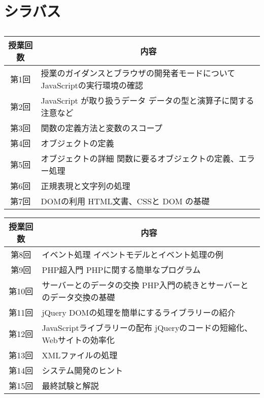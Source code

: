 \section{シラバス}\subsection{}
\begin{frame}
 \begin{center}
\begin{tabular}{|c|m{}|}\hline
 授業回数&\multicolumn{1}{c|}{内容}\\\hline
 第1回&授業のガイダンスとブラウザの開発者モードについて \newline
     JavaScriptの実行環境の確認\\\hline
 第2回&JavaScript が取り扱うデータ\newline
     データの型と演算子に関する注意など\\\hline
 第3回& 関数の定義方法と変数のスコープ\\\hline
 第4回& オブジェクトの定義\\\hline
 第5回&オブジェクトの詳細\newline
     関数に要るオブジェクトの定義、エラー処理\\\hline
 第6回&正規表現と文字列の処理  \\\hline
 第7回&DOMの利用\newline
     HTML文書、CSSと DOM の基礎\\\hline
\end{tabular}
\end{center}
\end{frame}
\begin{frame}
 \begin{center}
\begin{tabular}{|c|m{}|}\hline
 授業回数&\multicolumn{1}{c|}{内容}\\\hline
 第8回&イベント処理 \newline
     イベントモデルとイベント処理の例\\\hline
 第9回&PHP超入門\newline
       PHPに関する簡単なプログラム\\\hline
 第10回&サーバーとのデータの交換\newline
     PHP入門の続きとサーバーとのデータ交換の基礎\\\hline
 第11回&jQuery \newline
     DOMの処理を簡単にするライブラリーの紹介\\   \hline
 第12回&JavaScriptライブラリーの配布\newline
     jQueryのコードの短縮化、Webサイトの効率化 \\\hline
 第13回&XMLファイルの処理\\\hline
 第14回&システム開発のヒント\\\hline
 第15回&最終試験と解説\\ \hline
\end{tabular}
\end{center}
\end{frame}
